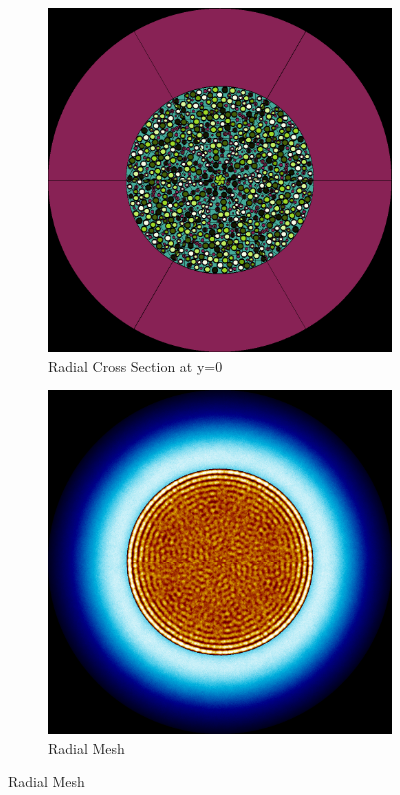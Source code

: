\begin{figure}[H]
\centering

\begin{subfigure}{0.45\textwidth}
  \includegraphics[width=0.95\linewidth]{figures/240-300/240-300-r}
  \caption{Radial Cross Section at y=0}
  \label{fig:240-300-r}
\end{subfigure}%
%
\begin{subfigure}{0.45\textwidth}
  \includegraphics[width=0.95\linewidth]{figures/240-300/240-300-rm}
  \caption{Radial Mesh}
  \label{fig:240-300-rm}
\end{subfigure}


\end{figure}
